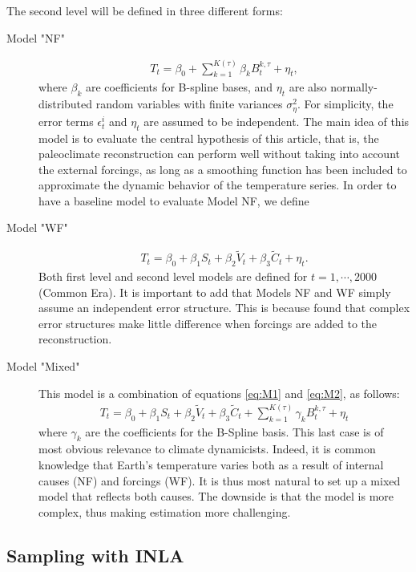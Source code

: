 \documentclass[12pt]{amsart}
\theoremstyle{plain}
\theoremstyle{definition}
\theoremstyle{remark}
\newcommand{\lb}[1]{\color{MidnightBlue}\textbf{[LB: #1]}\normalcolor}
\newcommand{\jeg}[1]{\color{ProcessBlue}\textbf{[JEG: #1]}\normalcolor}
\begin{document}
The second level will be defined in three different forms:
\begin{description}
\item[Model "NF"]
  \begin{align}\label{eq:M1}
    T_t=\beta_0+\sum_{k=1}^{K(\tau)}\beta_k B_t^{k,\tau}+\eta_t,
  \end{align}
where $\beta_k$ are coefficients for B-spline bases, and
$\eta_t$ are also normally-distributed random variables with finite variances
$\sigma^2_{\eta}$. For simplicity, the error terms $\epsilon^i_t$ and $\eta_t$
are assumed to be independent. The main idea of this model is to evaluate the
central hypothesis of this article, that is, the paleoclimate reconstruction can
perform  well without taking into account the external forcings, as long as a
smoothing function has been included to approximate the dynamic behavior of the
temperature series. In order to have a baseline model to evaluate Model NF, we
define
\item[Model "WF"]
  \begin{align}\label{eq:M2}
    T_t=\beta_0+\beta_1S_t+\beta_2\tilde V_t+\beta_3\tilde C_t+\eta_t.
  \end{align}
Both first level and second level models are defined for
$t=1,\cdots,2000$ (Common Era). It is important to add that Models NF and WF simply assume an independent error structure. This is because \cite{Barboza2014} 
found that complex error structures make little difference when forcings are added to the reconstruction.
\item[Model "Mixed"] 
\vskip 0.25in
  This model is a combination of equations \eqref{eq:M1} and \eqref{eq:M2}, as follows:
  \begin{align}\label{eq:M3}
    T_t=\beta_0+\beta_1S_t+\beta_2\tilde V_t+\beta_3\tilde C_t+\sum_{k=1}^{K(\tau)}\gamma_k B_t^{k,\tau}+\eta_t
  \end{align}
  where $\gamma_k$ are the coefficients for the B-Spline basis. %
  This last case is of most obvious relevance to climate dynamicists. Indeed, it is common knowledge that Earth's temperature varies both as a result of internal causes (NF) and forcings (WF). It is thus most natural to set up a mixed model that reflects both causes. The downside is that the model is more complex, thus making estimation more challenging. 
\end{description}


\subsection{Sampling with INLA}
\end{document}
